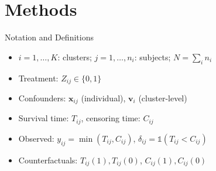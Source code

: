 \documentclass{beamer}
\begin{document}
\section{Methods}

\begin{frame}{Notation and Definitions}
  \begin{itemize}
    \vfill \item \(i = 1,\dots,K\): clusters; \(j = 1,\dots,n_i\): subjects; \(N = \sum_i n_i\)
    \vfill \item Treatment: \(Z_{ij} \in \{0,1\}\)
    \vfill \item Confounders: \(\mathbf{x}_{ij}\) (individual), \(\mathbf{v}_i\) (cluster-level)
    \vfill \item Survival time: \(T_{ij}\), censoring time: \(C_{ij}\)
    \vfill \item Observed: \(y_{ij} = \min(T_{ij}, C_{ij})\), \(\delta_{ij} = \mathds{1}(T_{ij} < C_{ij})\)
    \vfill \item Counterfactuals: \(T_{ij}(1), T_{ij}(0)\), \(C_{ij}(1), C_{ij}(0)\)
  \end{itemize}
\end{frame}
\end{document}
